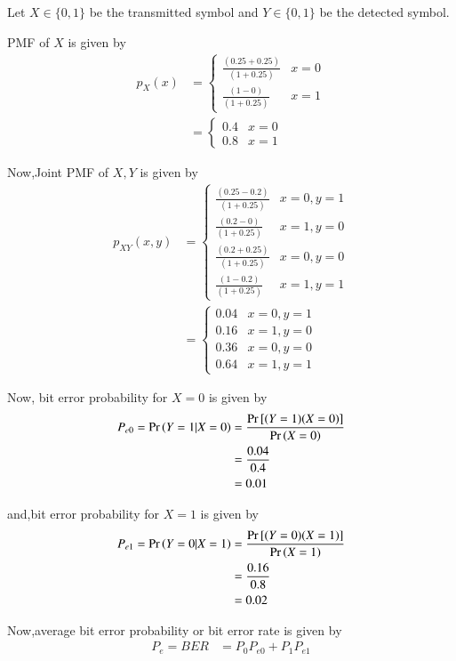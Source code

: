 \documentclass[journal,12pt,twocolumn]{IEEEtran}
\begin{document}
Let $X \in \{0,1\}$ be the transmitted symbol and $Y \in \{0,1\}$ be the detected symbol.

PMF of $X$ is given by
\begin{align}
p_X(x) &= 
\begin{cases} 
\frac{(0.25+0.25)}{(1+0.25)} & x=0 \\     
\frac{(1-0)}{(1+0.25)} & x=1
\end{cases}
\\
&=
\begin{cases} 
0.4 & x=0 \\     
0.8 & x=1
\end{cases}
\end{align}

Now,Joint PMF of $X,Y$ is given by
\begin{align}
p_{XY}(x,y) &= 
\begin{cases}  
\frac{(0.25-0.2)}{(1+0.25)} & x=0,y=1 \\
\frac{(0.2-0)}{(1+0.25)}  & x=1,y=0 \\
\frac{(0.2+0.25)}{(1+0.25)} & x=0,y=0 \\
\frac{(1-0.2)}{(1+0.25)} & x=1,y=1
\end{cases}
\\
&=
\begin{cases}  
0.04 & x=0,y=1 \\
0.16 & x=1,y=0 \\
0.36 & x=0,y=0 \\
0.64 & x=1,y=1
\end{cases}
\end{align}

Now, bit error probability for $X=0$ is given by
\begin{align}
    P_{e0} = \Pr\left(Y=1|X=0\right) &= \frac{\text{Pr}{}\left[(Y=1)(X=0)\right]}{\Pr\left(X=0\right)} \\
    &= \frac{0.04}{0.4} \\
    &= 0.01
\end{align}

and,bit error probability for $X=1$ is given by
\begin{align}
    P_{e1} = \Pr\left(Y=0|X=1\right) &= \frac{\text{Pr}{}\left[(Y=0)(X=1)\right]}{\Pr\left(X=1\right)} \\
    &= \frac{0.16}{0.8} \\
    &= 0.02
\end{align}

Now,average bit error probability or bit error rate is given by
\begin{align}
    P_e =BER &= P_0P_{e0}+P_1P_{e1}
\end{align}
\end{document}
